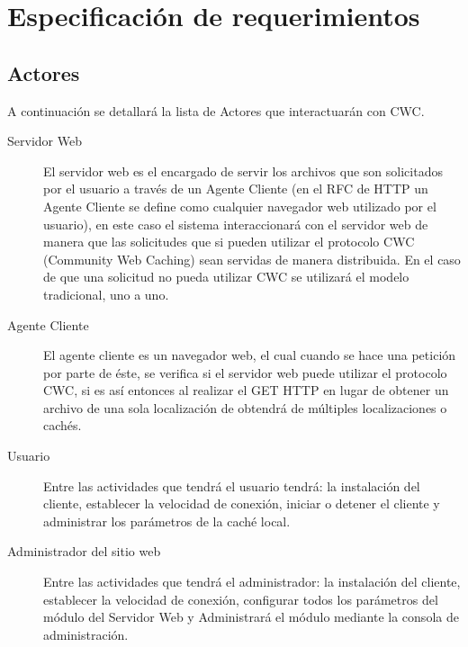 
\chapter{Especificación de requerimientos} %

\label{ch:especificacion_requerimientos} %


\section{Actores}

A continuación se detallará la lista de Actores que interactuarán con CWC. 

\begin{description}
\item[Servidor Web] El servidor web es el encargado de servir los archivos que son solicitados por el usuario a través de un Agente Cliente (en el RFC de HTTP \cite{rfc2616} un Agente Cliente se define como cualquier navegador web utilizado por el usuario), en este caso el sistema interaccionará con el servidor web de manera que las solicitudes que si pueden utilizar el protocolo CWC (Community Web Caching) sean servidas de manera distribuida. En el caso de que una solicitud no pueda utilizar CWC se utilizará el modelo tradicional, uno a uno.
\item[Agente Cliente] El agente cliente es un navegador web, el cual cuando se hace una petición por parte de éste, se verifica si el servidor web puede utilizar el protocolo CWC, si es así entonces al realizar el GET HTTP en lugar de obtener un archivo de una sola localización de obtendrá de múltiples localizaciones o cachés.
\item[Usuario] Entre las actividades que tendrá el usuario tendrá: la instalación del cliente, establecer la velocidad de conexión, iniciar o detener el cliente y administrar los parámetros de la caché local. 
\item[Administrador del sitio web] Entre las actividades que tendrá el administrador: la instalación del cliente, establecer la velocidad de conexión, configurar todos los parámetros del módulo del Servidor Web y Administrará el módulo mediante la consola de administración.
\end{description}

